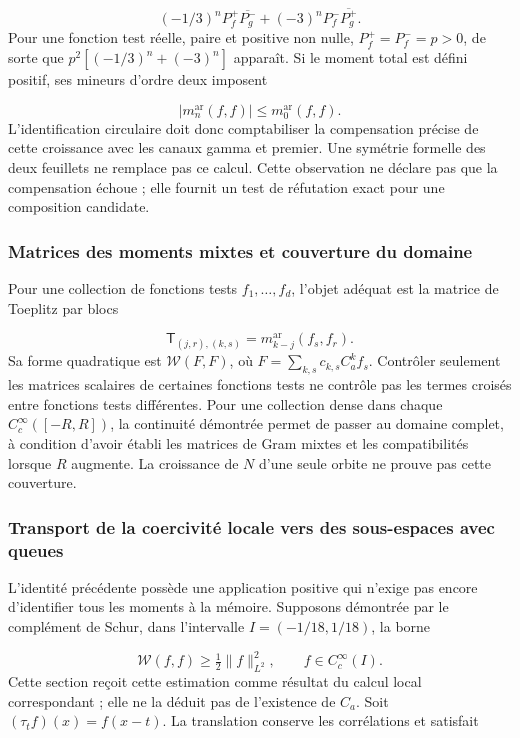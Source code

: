 \[
(-1/3)^nP_f^+\overline{P_g^-}
+(-3)^nP_f^-\overline{P_g^+}.
\]
Pour une fonction test réelle, paire et positive non nulle, \(P_f^+=P_f^-=p>0\), de sorte que \(p^2[(-1/3)^n+(-3)^n]\) apparaît. Si le moment total est défini positif, ses mineurs d'ordre deux imposent

\[
|m_n^{\mathrm{ar}}(f,f)|\le m_0^{\mathrm{ar}}(f,f).
\]
L'identification circulaire doit donc comptabiliser la compensation précise de cette croissance avec les canaux gamma et premier. Une symétrie formelle des deux feuillets ne remplace pas ce calcul. Cette observation ne déclare pas que la compensation échoue ; elle fournit un test de réfutation exact pour une composition candidate.


\subsubsection{Matrices des moments mixtes et couverture du domaine}
\label{tm-add-m6-2}
Pour une collection de fonctions tests \(f_1,\ldots,f_d\), l'objet adéquat est la matrice de Toeplitz par blocs

\[
\mathsf T_{(j,r),(k,s)}
=m_{k-j}^{\mathrm{ar}}(f_s,f_r).
\]
Sa forme quadratique est \(\mathscr W(F,F)\), où \(F=\sum_{k,s}c_{k,s}C_a^k f_s\). Contrôler seulement les matrices scalaires de certaines fonctions tests ne contrôle pas les termes croisés entre fonctions tests différentes. Pour une collection dense dans chaque \(C_c^\infty([-R,R])\), la continuité démontrée permet de passer au domaine complet, à condition d'avoir établi les matrices de Gram mixtes et les compatibilités lorsque \(R\) augmente. La croissance de \(N\) d'une seule orbite ne prouve pas cette couverture.


\subsubsection{Transport de la coercivité locale vers des sous-espaces avec queues}
\label{tm-add-m6-3}
\label{tm-add:familias-transportadas}
L'identité précédente possède une application positive qui n'exige pas encore d'identifier tous les moments à la mémoire. Supposons démontrée par le complément de Schur, dans l'intervalle \(I=(-1/18,1/18)\), la borne

\[
\mathscr W(f,f)\geq\tfrac12\|f\|_{L^2}^2,
\qquad f\in C_c^\infty(I).
\]
Cette section reçoit cette estimation comme résultat du calcul local correspondant ; elle ne la déduit pas de l'existence de \(C_a\). Soit \((\tau_t f)(x)=f(x-t)\). La translation conserve les corrélations et satisfait

